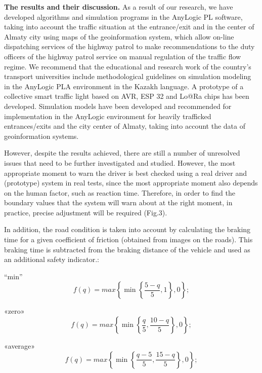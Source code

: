 \begin{multicols}{2}
{\bfseries The results and their discussion.} As a result of our research,
we have developed algorithms and simulation programs in the AnyLogic PL
software, taking into account the traffic situation at the entrance/exit
and in the center of Almaty city using maps of the geoinformation
system, which allow on-line dispatching services of the highway patrol
to make recommendations to the duty officers of the highway patrol
service on manual regulation of the traffic flow regime. We recommend
that the educational and research work of the country's transport
universities include methodological guidelines on simulation modeling in
the AnyLogic PLA environment in the Kazakh language. A prototype of a
collective smart traffic light based on AVR, ESP 32 and Lo@Ra chips has
been developed. Simulation models have been developed and recommended
for implementation in the AnyLogic environment for heavily trafficked
entrances/exits and the city center of Almaty, taking into account the
data of geoinformation systems.

However, despite the results achieved, there are still a number of
unresolved issues that need to be further investigated and studied.
However, the most appropriate moment to warn the driver is best checked
using a real driver and (prototype) system in real tests, since the most
appropriate moment also depends on the human factor, such as reaction
time. Therefore, in order to find the boundary values that the system
will warn about at the right moment, in practice, precise adjustment
will be required (Fig.3).

In addition, the road condition is taken into account by calculating the
braking time for a given coefficient of friction (obtained from images
on the roads). This braking time is subtracted from the braking distance
of the vehicle and used as an additional safety indicator.:
\end{multicols}

``min''
\begin{equation}
f(q) = max\left\{ \min\left\{ \frac{5 - q}{5},1 \right\},0 \right\};
\end{equation}

«zero»
\begin{equation}
f(q) = max\left\{ \min\left\{ \frac{q}{5},\frac{10 - q}{5} \right\},0 \right\};
\end{equation}

«average»
\begin{equation}
f(q) = max\left\{ \min\left\{ \frac{q - 5}{5},\frac{15 - q}{5} \right\},0 \right\};
\end{equation}

